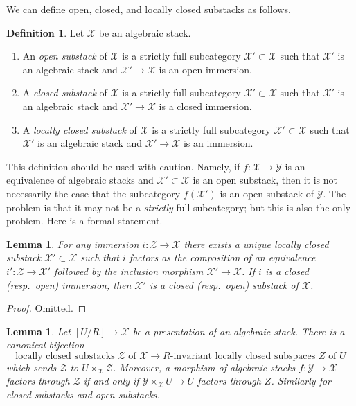 \documentclass{stacks-project}
\theoremstyle{plain}
\newtheorem{lemma}[subsection]{Lemma}
\theoremstyle{definition}
\newtheorem{definition}[subsection]{Definition}
\theoremstyle{remark}
\numberwithin{equation}{subsection}
\begin{document}
\noindent
We can define open, closed, and locally closed substacks as follows.

\begin{definition}
\label{definition-substacks}
Let $\mathcal{X}$ be an algebraic stack.
\begin{enumerate}
\item An {\it open substack} of $\mathcal{X}$ is a strictly full subcategory
$\mathcal{X}' \subset \mathcal{X}$ such that $\mathcal{X}'$ is an algebraic
stack and $\mathcal{X}' \to \mathcal{X}$ is an open immersion.
\item A {\it closed substack} of $\mathcal{X}$ is a strictly full subcategory
$\mathcal{X}' \subset \mathcal{X}$ such that $\mathcal{X}'$ is an algebraic
stack and $\mathcal{X}' \to \mathcal{X}$ is a closed immersion.
\item A {\it locally closed substack} of $\mathcal{X}$ is a strictly full
subcategory $\mathcal{X}' \subset \mathcal{X}$ such that $\mathcal{X}'$
is an algebraic stack and $\mathcal{X}' \to \mathcal{X}$ is an immersion.
\end{enumerate}
\end{definition}

\noindent
This definition should be used with caution. Namely, if
$f : \mathcal{X} \to \mathcal{Y}$ is an equivalence of algebraic stacks
and $\mathcal{X}' \subset \mathcal{X}$ is an open substack, then it
is not necessarily the case that the subcategory $f(\mathcal{X}')$
is an open substack of $\mathcal{Y}$. The problem is that it may not
be a {\it strictly} full subcategory; but this is also the only problem.
Here is a formal statement.

\begin{lemma}
\label{lemma-substack-image}
For any immersion $i : \mathcal{Z} \to \mathcal{X}$ there exists a
unique locally closed substack $\mathcal{X}' \subset \mathcal{X}$
such that $i$ factors as the composition of
an equivalence $i' : \mathcal{Z} \to \mathcal{X}'$
followed by the inclusion morphism $\mathcal{X}' \to \mathcal{X}$.
If $i$ is a closed (resp.\ open) immersion, then $\mathcal{X}'$
is a closed (resp.\ open) substack of $\mathcal{X}$.
\end{lemma}

\begin{proof}
Omitted.
\end{proof}

\begin{lemma}
\label{lemma-substacks-presentation}
Let $[U/R] \to \mathcal{X}$ be a presentation of an algebraic stack.
There is a canonical bijection
$$
\text{locally closed substacks }\mathcal{Z}\text{ of }\mathcal{X}
\longrightarrow
R\text{-invariant locally closed subspaces }Z\text{ of }U
$$
which sends $\mathcal{Z}$ to $U \times_\mathcal{X} \mathcal{Z}$.
Moreover, a morphism of algebraic stacks $f : \mathcal{Y} \to \mathcal{X}$
factors through $\mathcal{Z}$ if and only if
$\mathcal{Y} \times_\mathcal{X} U \to U$ factors through $Z$.
Similarly for closed substacks and open substacks.
\end{lemma}
\end{document}
